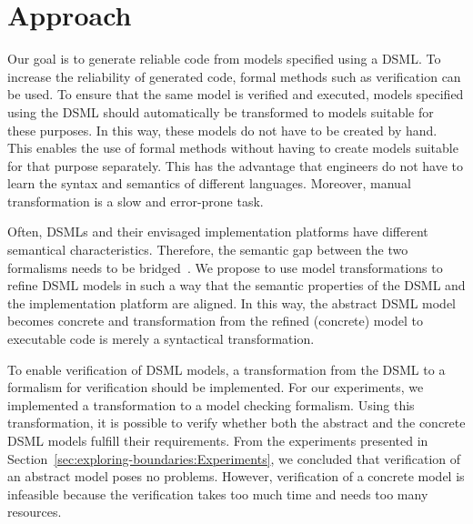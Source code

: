 \section{Approach}
\label{sec:exploring-boundaries:Approach}
Our goal is to generate reliable code from models specified using a DSML.
To increase the reliability of generated code, formal methods such as verification can be used.
To ensure that the same model is verified and executed, models specified using the DSML should automatically be transformed to models suitable for these purposes.
In this way, these models do not have to be created by hand.
This enables the use of formal methods without having to create models suitable for that purpose separately.
This has the advantage that engineers do not have to learn the syntax and semantics of different languages.
Moreover, manual transformation is a slow and error-prone task.

Often, DSMLs and their envisaged implementation platforms have different semantical characteristics.
Therefore, the semantic gap between the two formalisms needs to be bridged~\cite{Amstel2008}.
We propose to use model transformations to refine DSML models in such a way that the semantic properties of the DSML and the implementation platform are aligned.
In this way, the abstract DSML model becomes concrete and transformation from the refined (concrete) model to executable code is merely a syntactical transformation.

To enable verification of DSML models, a transformation from the DSML to a formalism for verification should be implemented.
For our experiments, we implemented a transformation to a model checking formalism.
Using this transformation, it is possible to verify whether both the abstract and the concrete DSML models fulfill their requirements.
From the experiments presented in Section~\ref{sec:exploring-boundaries:Experiments}, we concluded that verification of an abstract model poses no problems.
However, verification of a concrete model is infeasible because the verification takes too much time and needs too many resources.

